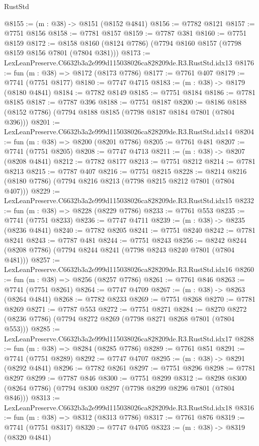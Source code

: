 \begin{lexlean}{RustStd}
\begin{coremodule}
@8155 := (m : @38) -> @8151 (@8152 @4841)
@8156 := @7782 @8121
@8157 := @7751 @8156
@8158 := @7781 @8157
@8159 := @7787 @381
@8160 := @7751 @8159
@8172 := @8158 @8160 (@8124 @7786) (@7794 @8160 @8157 (@7798 @8159 @8156 @7801 (@7804 @381)))
@8173 := LexLeanPreserve.C6632b3a2e999d115038026ca828209de.R3.RustStd.idx13
@8176 := fun (m : @38) => @8172 (@8173 @7786)
@8177 := @7761 @407
@8179 := @7741 (@7751 @8177)
@8180 := @7747 @4715
@8183 := (m : @38) -> @8179 (@8180 @4841)
@8184 := @7782 @8149
@8185 := @7751 @8184
@8186 := @7781 @8185
@8187 := @7787 @396
@8188 := @7751 @8187
@8200 := @8186 @8188 (@8152 @7786) (@7794 @8188 @8185 (@7798 @8187 @8184 @7801 (@7804 @396)))
@8201 := LexLeanPreserve.C6632b3a2e999d115038026ca828209de.R3.RustStd.idx14
@8204 := fun (m : @38) => @8200 (@8201 @7786)
@8205 := @7761 @481
@8207 := @7741 (@7751 @8205)
@8208 := @7747 @4713
@8211 := (m : @38) -> @8207 (@8208 @4841)
@8212 := @7782 @8177
@8213 := @7751 @8212
@8214 := @7781 @8213
@8215 := @7787 @407
@8216 := @7751 @8215
@8228 := @8214 @8216 (@8180 @7786) (@7794 @8216 @8213 (@7798 @8215 @8212 @7801 (@7804 @407)))
@8229 := LexLeanPreserve.C6632b3a2e999d115038026ca828209de.R3.RustStd.idx15
@8232 := fun (m : @38) => @8228 (@8229 @7786)
@8233 := @7761 @553
@8235 := @7741 (@7751 @8233)
@8236 := @7747 @4711
@8239 := (m : @38) -> @8235 (@8236 @4841)
@8240 := @7782 @8205
@8241 := @7751 @8240
@8242 := @7781 @8241
@8243 := @7787 @481
@8244 := @7751 @8243
@8256 := @8242 @8244 (@8208 @7786) (@7794 @8244 @8241 (@7798 @8243 @8240 @7801 (@7804 @481)))
@8257 := LexLeanPreserve.C6632b3a2e999d115038026ca828209de.R3.RustStd.idx16
@8260 := fun (m : @38) => @8256 (@8257 @7786)
@8261 := @7761 @846
@8263 := @7741 (@7751 @8261)
@8264 := @7747 @4709
@8267 := (m : @38) -> @8263 (@8264 @4841)
@8268 := @7782 @8233
@8269 := @7751 @8268
@8270 := @7781 @8269
@8271 := @7787 @553
@8272 := @7751 @8271
@8284 := @8270 @8272 (@8236 @7786) (@7794 @8272 @8269 (@7798 @8271 @8268 @7801 (@7804 @553)))
@8285 := LexLeanPreserve.C6632b3a2e999d115038026ca828209de.R3.RustStd.idx17
@8288 := fun (m : @38) => @8284 (@8285 @7786)
@8289 := @7761 @851
@8291 := @7741 (@7751 @8289)
@8292 := @7747 @4707
@8295 := (m : @38) -> @8291 (@8292 @4841)
@8296 := @7782 @8261
@8297 := @7751 @8296
@8298 := @7781 @8297
@8299 := @7787 @846
@8300 := @7751 @8299
@8312 := @8298 @8300 (@8264 @7786) (@7794 @8300 @8297 (@7798 @8299 @8296 @7801 (@7804 @846)))
@8313 := LexLeanPreserve.C6632b3a2e999d115038026ca828209de.R3.RustStd.idx18
@8316 := fun (m : @38) => @8312 (@8313 @7786)
@8317 := @7761 @876
@8319 := @7741 (@7751 @8317)
@8320 := @7747 @4705
@8323 := (m : @38) -> @8319 (@8320 @4841)

\end{coremodule}
\end{lexlean}
